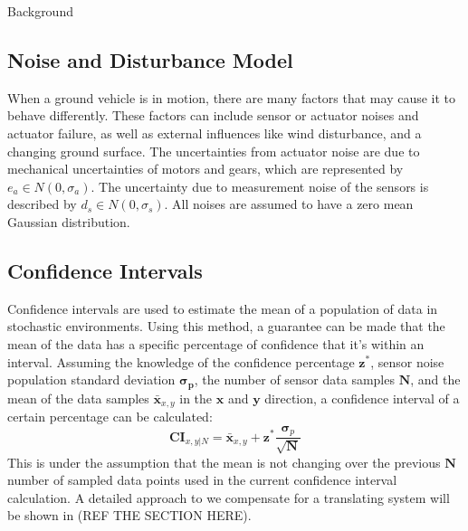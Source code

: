 \begin{section}{Background}
 \subsection{Noise and Disturbance Model}
When a ground vehicle is in motion, there are many factors that may cause it to behave differently. These factors can include sensor or actuator noises and actuator failure, as well as external influences like wind disturbance, and a changing ground surface. The uncertainties from actuator noise are due to mechanical uncertainties of motors and gears, which are represented by $ e_a \in N(0,\sigma_a) $. The uncertainty due to measurement noise of the sensors is described by $ d_s \in N(0,\sigma_s) $. All noises are assumed to have a zero mean Gaussian distribution.

 \subsection{Confidence Intervals}

Confidence intervals are used to estimate the mean of a population of data in stochastic environments. Using this method, a guarantee can be made that the mean of the data has a specific percentage of confidence that it's within an interval. Assuming the knowledge of the confidence percentage $ \bm{z^{*}} $, sensor noise population standard deviation $ \bm{\sigma_p} $, the number of sensor data samples $ \bm{N} $, and the mean of the data samples $ \bm{\bar{x}}_{x,y} $ in the $\bm{x}$ and $\bm{y}$ direction, a confidence interval of a certain percentage can be calculated: 
 	\begin{equation}
		\bm{CI}_{x,y|N} = \bm{\bar{x}}_{x,y} + \bm{z^{*}}\frac{\bm{\sigma}_p}{\sqrt{\bm{N}}}
	\end{equation}
This is under the assumption that the mean is not changing over the previous $\bm{N}$ number of sampled data points used in the current confidence interval calculation. A detailed approach to we compensate for a translating system will be shown in (REF THE SECTION HERE).

























\end{section}